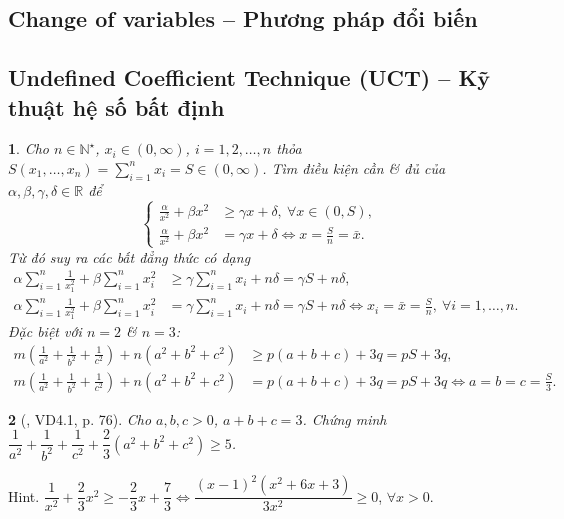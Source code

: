 \documentclass{article}
\newtheorem{baitoan}{}
\begin{document}
\subsection{Change of variables -- Phương pháp đổi biến}

\subsection{Undefined Coefficient Technique (UCT) -- Kỹ thuật hệ số bất định}

\begin{baitoan}
	Cho $n\in\mathbb{N}^\star$, $x_i\in(0,\infty)$, $i = 1,2,\ldots,n$ thỏa $S(x_1,\ldots,x_n) = \sum_{i=1}^n x_i = S\in(0,\infty)$. Tìm điều kiện cần \& đủ của $\alpha,\beta,\gamma,\delta\in\mathbb{R}$  để
	\begin{equation*}
		\left\{\begin{split}
			\frac{\alpha}{x^2} + \beta x^2&\ge\gamma x + \delta,\ \forall x\in(0,S),\\
			\frac{\alpha}{x^2} + \beta x^2 &= \gamma x + \delta\Leftrightarrow x = \frac{S}{n} = \bar{x}.
		\end{split}\right.
	\end{equation*}
	Từ đó suy ra các bất đẳng thức có dạng
	\begin{align*}
		\alpha\sum_{i=1}^n \frac{1}{x_1^2} + \beta\sum_{i=1}^n x_i^2&\ge\gamma\sum_{i=1}^n x_i + n\delta = \gamma S + n\delta,\\
		\alpha\sum_{i=1}^n \frac{1}{x_1^2} + \beta\sum_{i=1}^n x_i^2 &= \gamma\sum_{i=1}^n x_i + n\delta = \gamma S + n\delta\Leftrightarrow x_i = \bar{x} = \frac{S}{n},\ \forall i = 1,\ldots,n.
	\end{align*}	
	Đặc biệt với $n = 2$ \& $n = 3$:
	\begin{align}
		m\left(\frac{1}{a^2} + \frac{1}{b^2} + \frac{1}{c^2}\right) + n(a^2 + b^2 + c^2)&\ge p(a + b + c) + 3q = pS + 3q,\\
		m\left(\frac{1}{a^2} + \frac{1}{b^2} + \frac{1}{c^2}\right) + n(a^2 + b^2 + c^2) &= p(a + b + c) + 3q = pS + 3q\Leftrightarrow a = b = c = \frac{S}{3}.
	\end{align}
\end{baitoan}

\begin{baitoan}[\cite{Son_Nghiep_Trung_Can_bdt}, VD4.1, p. 76]
	Cho $a,b,c > 0$, $a + b + c = 3$. Chứng minh $\dfrac{1}{a^2} + \dfrac{1}{b^2} + \dfrac{1}{c^2} + \dfrac{2}{3}(a^2 + b^2 + c^2)\ge5$.
\end{baitoan}
{\sf Hint.} $\dfrac{1}{x^2} + \dfrac{2}{3}x^2\ge-\dfrac{2}{3}x + \dfrac{7}{3}\Leftrightarrow\dfrac{(x - 1)^2(x^2 + 6x + 3)}{3x^2}\ge0$, $\forall x > 0$.
\end{document}
